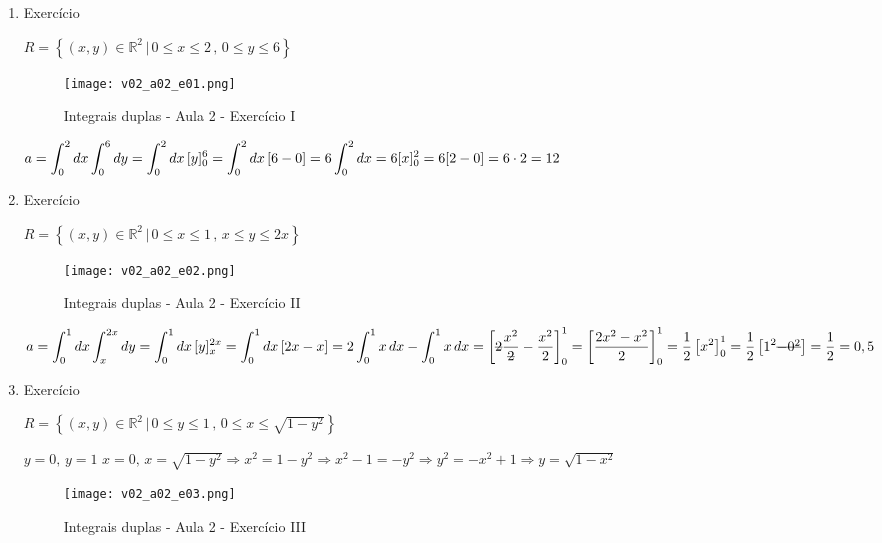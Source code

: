 \begin{enumerate}
	\item Exercício
	
	$R = \left\{(x, y) \in \mathbb{R}^2 \,|\, 0 \leq x \leq 2 \,,\, 0 \leq y \leq 6 \right\}$
	
	\begin{figure}[H]
		\caption{Integrais duplas - Aula 2 - Exercício I}
		\label{v02_a02_e01}
		\centering
		\texttt{[image: v02\_a02\_e01.png]}		
	\end{figure}
	
	$a = \displaystyle\int_0^2 dx \displaystyle\int_0^6 dy = \displaystyle\int_0^2 dx\, [y]_0^6 = \displaystyle\int_0^2 dx\, [6 - 0] = 6\displaystyle\int_0^2 dx = 6[x]_0^2 = 6[2 - 0] = 6 \cdot 2 = 12$
	
	\item Exercício
	
	$R = \left\{(x, y) \in \mathbb{R}^2 \,|\, 0 \leq x \leq 1 \,,\, x \leq y \leq 2x \right\}$
						
	\begin{figure}[H]
		\caption{Integrais duplas - Aula 2 - Exercício II}
		\label{v02_a02_e02}
		\centering
		\texttt{[image: v02\_a02\_e02.png]}		
	\end{figure}
	
	$a = \integral_0^1 dx \integral_{x}^{2x} dy = \integral_0^1 dx\, [y]_{x}^{2x} = \integral_0^1 dx\, [2x - x] = 2\integral_0^1 x\, dx - \integral_0^1 x\, dx = \left[\overstrike{2}\dfrac{x^2}{\overstrike{2}} - \dfrac{x^2}{2}\right]_0^1 = \left[\dfrac{2x^2 - x^2}{2}\right]_0^1 = \dfrac{1}{2}\left[x^2\right]_0^1 = \dfrac{1}{2}\left[1^2 \overstrike{- 0^2}\right] = \dfrac{1}{2} = 0,5 $
	
	\item Exercício
	
	$R = \left\{(x, y) \in \mathbb{R}^2 \,|\, 0 \leq y \leq 1 \,,\, 0 \leq x \leq \sqrt{1 - y^2} \right\}$
	
	$y = 0,\, y=1$\newline
	$x = 0,\, x = \sqrt{1 - y^2} \Rightarrow x^2 = 1 - y^2 \Rightarrow x^2 - 1 = -y^2 \Rightarrow y^2 = -x^2 + 1 \Rightarrow y = \sqrt{1 -x^2}$
					
	\begin{figure}[H]
		\caption{Integrais duplas - Aula 2 - Exercício III}
		\label{v02_a02_e03}
		\centering
		\texttt{[image: v02\_a02\_e03.png]}		
	\end{figure}
	

\end{enumerate}
